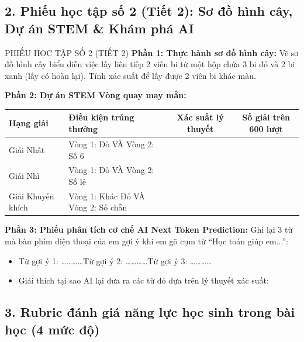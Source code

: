 \documentclass[12pt, a4paper]{article}
\begin{document}
\subsection*{2. Phiếu học tập số 2 (Tiết 2): Sơ đồ hình cây, Dự án STEM \& Khám phá AI}

\begin{pedabox}{PHIẾU HỌC TẬP SỐ 2 (TIẾT 2)}
\textbf{Phần 1: Thực hành sơ đồ hình cây:}
Vẽ sơ đồ hình cây biểu diễn việc lấy liên tiếp 2 viên bi từ một hộp chứa 3 bi đỏ và 2 bi xanh (lấy có hoàn lại). Tính xác suất để lấy được 2 viên bi khác màu.

\textbf{Phần 2: Dự án STEM Vòng quay may mắn:}
\begin{center}
\begin{tabularx}{\linewidth}{|l|X|c|c|}
\hline
\textbf{Hạng giải} & \textbf{Điều kiện trúng thưởng} & \textbf{Xác suất lý thuyết} & \textbf{Số giải trên 600 lượt} \\ \hline
Giải Nhất & Vòng 1: Đỏ VÀ Vòng 2: Số 6 & & \\ \hline
Giải Nhì & Vòng 1: Đỏ VÀ Vòng 2: Số lẻ & & \\ \hline
Giải Khuyến khích & Vòng 1: Khác Đỏ VÀ Vòng 2: Số chẵn & & \\ \hline
\end{tabularx}
\end{center}

\textbf{Phần 3: Phiếu phân tích cơ chế AI Next Token Prediction:}
Ghi lại 3 từ mà bàn phím điện thoại của em gợi ý khi em gõ cụm từ ``Học toán giúp em...'':
\begin{itemize}
    \item Từ gợi ý 1: \dots\dots\dots\dots \quad Từ gợi ý 2: \dots\dots\dots\dots \quad Từ gợi ý 3: \dots\dots\dots\dots
    \item Giải thích tại sao AI lại đưa ra các từ đó dựa trên lý thuyết xác suất: \dotfill
\end{itemize}
\end{pedabox}

\subsection*{3. Rubric đánh giá năng lực học sinh trong bài học (4 mức độ)}
\end{document}

